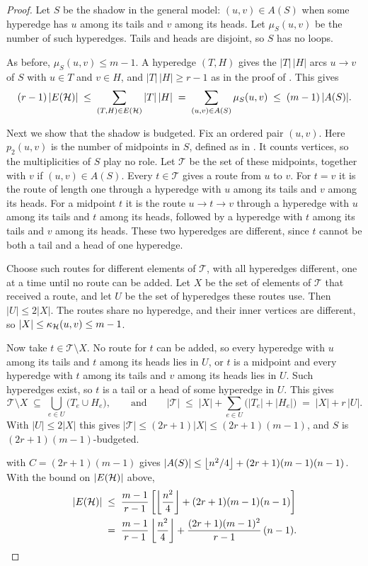 \begin{proof}
Let $S$ be the shadow in the general model: $(u,v) \in A(S)$ when some hyperedge has $u$ among its tails and $v$ among its heads. Let $\mu_S(u,v)$ be the number of such hyperedges. Tails and heads are disjoint, so $S$ has no loops.

As before, $\mu_S(u,v) \le m-1$.
A hyperedge $(T,H)$ gives the $|T|\,|H|$ arcs $u\to v$ of $S$ with $u\in T$ and $v\in H$, and $|T|\,|H|\ge r-1$ as in the proof of . This gives
\[
    (r-1)\,|E(\mathcal{H})| \;\le\; \sum_{(T,H) \in E(\mathcal{H})} |T|\,|H|
    \;=\; \sum_{(u,v) \in A(S)} \mu_S(u,v) \;\le\; (m-1)\,|A(S)| .
\]

Next we show that the shadow is budgeted.
Fix an ordered pair $(u,v)$. Here $p_2(u,v)$ is the number of midpoints in $S$, defined as in . It counts vertices, so the multiplicities of $S$ play no role.
Let $\mathcal{T}$ be the set of these midpoints, together with $v$ if $(u,v) \in A(S)$.
Every $t \in \mathcal{T}$ gives a route from $u$ to $v$.
For $t = v$ it is the route of length one through a hyperedge with $u$ among its tails and $v$ among its heads.
For a midpoint $t$ it is the route $u \to t \to v$ through a hyperedge with $u$ among its tails and $t$ among its heads, followed by a hyperedge with $t$ among its tails and $v$ among its heads.
These two hyperedges are different, since $t$ cannot be both a tail and a head of one hyperedge.

Choose such routes for different elements of $\mathcal{T}$, with all hyperedges different, one at a time until no route can be added.
Let $X$ be the set of elements of $\mathcal{T}$ that received a route, and let $U$ be the set of hyperedges these routes use. Then $|U| \le 2|X|$.
The routes share no hyperedge, and their inner vertices are different, so $|X| \le \kappa_{\mathcal{H}}(u,v) \le m-1$.

Now take $t \in \mathcal{T} \setminus X$.
No route for $t$ can be added, so every hyperedge with $u$ among its tails and $t$ among its heads lies in $U$, or $t$ is a midpoint and every hyperedge with $t$ among its tails and $v$ among its heads lies in $U$.
Such hyperedges exist, so $t$ is a tail or a head of some hyperedge in $U$. This gives
\[
    \mathcal{T} \setminus X \;\subseteq\; \bigcup_{e \in U} \bigl(T_e \cup H_e\bigr) ,
    \qquad\text{and}\qquad
    |\mathcal{T}| \;\le\; |X| + \sum_{e \in U} \bigl(|T_e| + |H_e|\bigr)
    \;=\; |X| + r\,|U| .
\]
With $|U| \le 2|X|$ this gives $|\mathcal{T}| \le (2r+1)|X| \le (2r+1)(m-1)$, and $S$ is $(2r+1)(m-1)$-budgeted.

 with $C = (2r+1)(m-1)$ gives $|A(S)| \le \left\lfloor n^2/4 \right\rfloor + (2r+1)(m-1)(n-1)$. With the bound on $|E(\mathcal{H})|$ above,
\[
\begin{aligned}
    |E(\mathcal{H})| &\;\le\; \frac{m-1}{r-1}\left[\left\lfloor \frac{n^2}{4} \right\rfloor + (2r+1)(m-1)(n-1)\right] \\
    &\;=\; \frac{m-1}{r-1}\left\lfloor \frac{n^2}{4} \right\rfloor + \frac{(2r+1)(m-1)^2}{r-1}\,(n-1).
\end{aligned}
\]
\end{proof}

